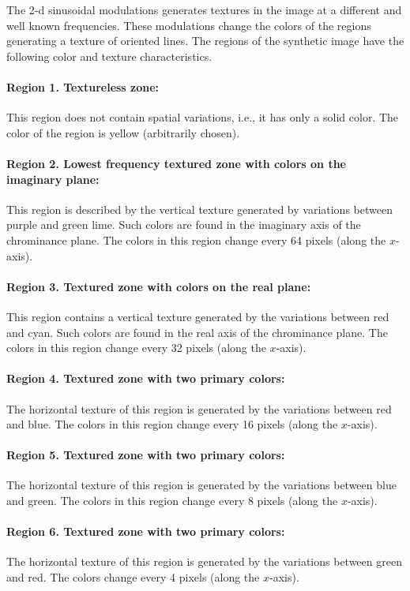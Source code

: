 The 2-d sinusoidal modulations generates textures in the image at a different and well known frequencies. These modulations change the colors of the regions generating a texture of oriented lines. The regions of the synthetic image have the following color and texture characteristics.

\paragraph{Region 1. Textureless zone:}
This region does not contain spatial variations, i.e., it has only a solid color. The color of the region is yellow (arbitrarily chosen).

\paragraph{Region 2. Lowest frequency textured zone with colors on the imaginary plane:}
This region is described by the vertical texture generated by variations between purple and green lime. Such colors are found in the imaginary axis of the chrominance plane. The colors in this region change every 64 pixels (along the $x$-axis).

\paragraph{Region 3. Textured zone with colors on the real plane:}
This region contains a vertical texture generated by the variations between red and cyan. Such colors are found in the real axis of the chrominance plane. The colors in this region change every 32 pixels (along the $x$-axis).

\paragraph{Region 4. Textured zone with two primary colors:}
The horizontal texture of this region is generated by the variations between red and blue. The colors in this region change every 16 pixels (along the $x$-axis). 

\paragraph{Region 5. Textured zone with two primary colors:}
The horizontal texture of this region is generated by the variations between blue and green. The colors in this region change every 8 pixels (along the $x$-axis). 

\paragraph{Region 6. Textured zone with two primary colors:}
The horizontal texture of this region is generated by the variations between green and red. The colors change every 4 pixels (along the $x$-axis).

